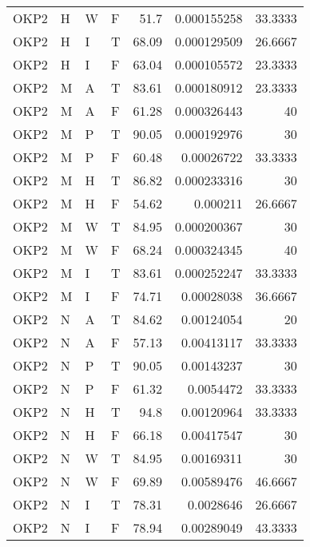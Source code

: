 \begin{table}[!htb]
{\begin{tabular}{llllrrr}
            OKP2     & H     & W     & F          & 51.7       & 0.000155258 & 33.3333  \\
            OKP2     & H     & I     & T          & 68.09      & 0.000129509 & 26.6667  \\
            OKP2     & H     & I     & F          & 63.04      & 0.000105572 & 23.3333  \\
            OKP2     & M     & A     & T          & 83.61      & 0.000180912 & 23.3333  \\
            OKP2     & M     & A     & F          & 61.28      & 0.000326443 & 40       \\
            OKP2     & M     & P     & T          & 90.05      & 0.000192976 & 30       \\
            OKP2     & M     & P     & F          & 60.48      & 0.00026722  & 33.3333  \\
            OKP2     & M     & H     & T          & 86.82      & 0.000233316 & 30       \\
            OKP2     & M     & H     & F          & 54.62      & 0.000211    & 26.6667  \\
            OKP2     & M     & W     & T          & 84.95      & 0.000200367 & 30       \\
            OKP2     & M     & W     & F          & 68.24      & 0.000324345 & 40       \\
            OKP2     & M     & I     & T          & 83.61      & 0.000252247 & 33.3333  \\
            OKP2     & M     & I     & F          & 74.71      & 0.00028038  & 36.6667  \\
            OKP2     & N     & A     & T          & 84.62      & 0.00124054  & 20       \\
            OKP2     & N     & A     & F          & 57.13      & 0.00413117  & 33.3333  \\
            OKP2     & N     & P     & T          & 90.05      & 0.00143237  & 30       \\
            OKP2     & N     & P     & F          & 61.32      & 0.0054472   & 33.3333  \\
            OKP2     & N     & H     & T          & 94.8       & 0.00120964  & 33.3333  \\
            OKP2     & N     & H     & F          & 66.18      & 0.00417547  & 30       \\
            OKP2     & N     & W     & T          & 84.95      & 0.00169311  & 30       \\
            OKP2     & N     & W     & F          & 69.89      & 0.00589476  & 46.6667  \\
            OKP2     & N     & I     & T          & 78.31      & 0.0028646   & 26.6667  \\
            OKP2     & N     & I     & F          & 78.94      & 0.00289049  & 43.3333  \\
            \hline
        \end{tabular}
    }{}
\end{table}